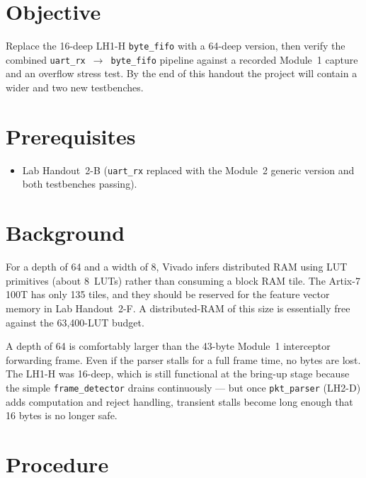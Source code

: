 \documentclass[11pt,letterpaper]{article}
\begin{document}

\section{Objective}
Replace the 16-deep LH1-H \texttt{byte\_fifo} with a 64-deep version, then verify the combined \texttt{uart\_rx}~$\to$~\texttt{byte\_fifo} pipeline against a recorded Module~1 capture and an overflow stress test. By the end of this handout the project will contain a wider \FIFO{} and two new testbenches.

\section{Prerequisites}
\begin{itemize}[leftmargin=2em]
	\item Lab Handout~2-B (\texttt{uart\_rx} replaced with the Module~2 generic version and both testbenches passing).
\end{itemize}

\section{Background}

\begin{tcolorbox}[infobox={Distributed RAM vs.\ block RAM}]
	For a depth of 64 and a width of 8, Vivado infers distributed \mbox{RAM} using \mbox{LUT} primitives (about 8~\mbox{LUT}s) rather than consuming a block \mbox{RAM} tile. The Artix-7 100T has only 135 \BRAM{} tiles, and they should be reserved for the feature vector memory in Lab Handout~2-F. A distributed-\mbox{RAM} \FIFO{} of this size is essentially free against the 63{,}400-\mbox{LUT} budget.
\end{tcolorbox}

A depth of 64 is comfortably larger than the 43-byte Module~1 interceptor forwarding frame. Even if the parser stalls for a full frame time, no bytes are lost. The LH1-H \FIFO{} was 16-deep, which is still functional at the bring-up stage because the simple \texttt{frame\_detector} drains continuously --- but once \texttt{pkt\_parser} (LH2-D) adds \CRC{} computation and reject handling, transient stalls become long enough that 16 bytes is no longer safe.

\section{Procedure}
\end{document}
